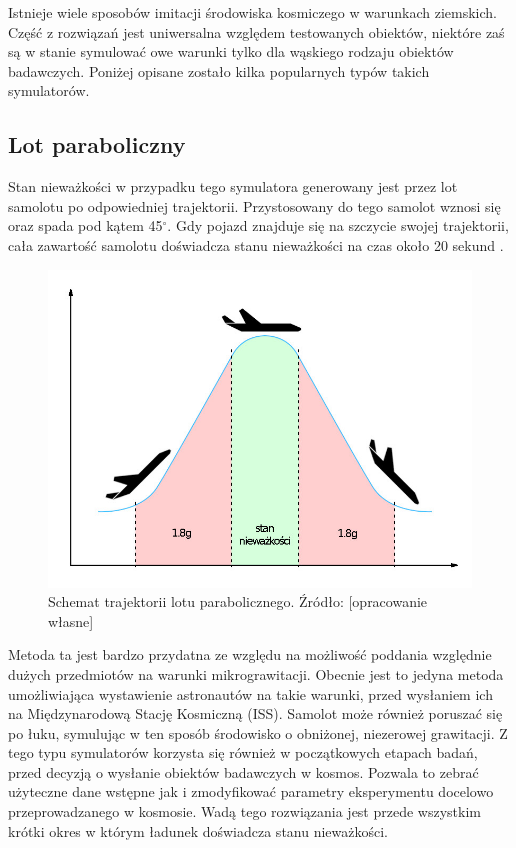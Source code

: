Istnieje wiele sposobów imitacji środowiska kosmiczego w warunkach ziemskich. Część z
 rozwiązań jest uniwersalna względem testowanych obiektów, niektóre zaś są w stanie
  symulować owe warunki tylko dla wąskiego rodzaju obiektów badawczych. Poniżej opisane
   zostało kilka popularnych typów takich symulatorów.

\subsection{Lot paraboliczny}

Stan nieważkości w przypadku tego symulatora generowany jest przez lot samolotu po
 odpowiedniej trajektorii. Przystosowany do tego samolot wznosi się oraz spada pod kątem
  45$^\circ$. Gdy pojazd znajduje się na szczycie swojej trajektorii, cała zawartość
   samolotu doświadcza stanu nieważkości na czas około 20 sekund
    \cite{bib:lot_paraboliczny}. 

\begin{figure}[h]
	
	\centering
	\includegraphics[scale=1.3]{lot_para_sch.jpg}
	\caption{Schemat trajektorii lotu parabolicznego. Źródło: [opracowanie własne]}
	\label{fig:paraboliczny}
	
\end{figure}

Metoda ta jest bardzo przydatna ze względu na możliwość poddania względnie dużych
 przedmiotów na warunki mikrograwitacji. Obecnie jest to jedyna metoda umożliwiająca
  wystawienie astronautów na takie warunki, przed wysłaniem ich na Międzynarodową Stację
   Kosmiczną (ISS)\cite{bib:lot_paraboliczny}. Samolot może również poruszać się po
    łuku, symulując w ten sposób środowisko o obniżonej, niezerowej grawitacji. Z tego
     typu symulatorów korzysta się również w początkowych etapach badań, przed decyzją o
      wysłanie obiektów badawczych w kosmos. Pozwala to zebrać użyteczne dane wstępne
       jak i zmodyfikować parametry eksperymentu docelowo przeprowadzanego w kosmosie.
        Wadą tego rozwiązania jest przede wszystkim krótki okres w którym ładunek
         doświadcza stanu nieważkości.

